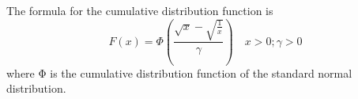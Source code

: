 The formula for the cumulative distribution function is
\[
{\displaystyle F(x)=\Phi \left({\frac {{\sqrt {x}}-{\sqrt {\frac {1}{x}}}}{\gamma }}\right)\quad x>0;\gamma >0}
\]
where Φ is the cumulative distribution function of the standard normal distribution.

